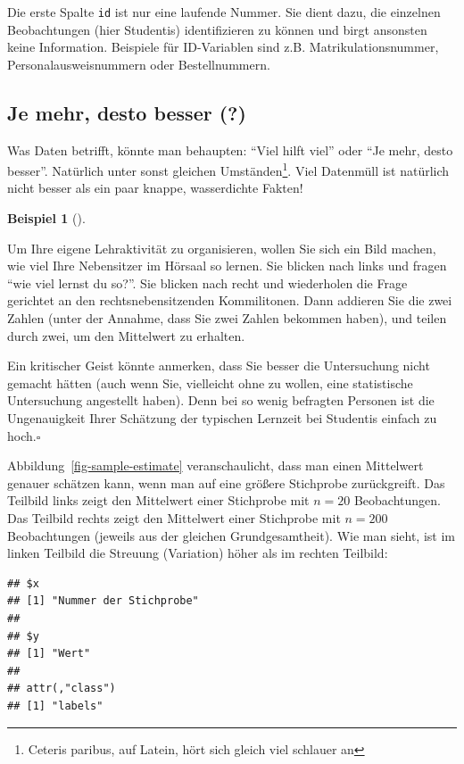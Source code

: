 \documentclass[
  a4paper,
  DIV=11]{scrreprt}
\theoremstyle{definition}
\theoremstyle{definition}
\newtheorem{example}{Beispiel}[chapter]
\theoremstyle{definition}
\theoremstyle{remark}
\begin{document}
Die erste Spalte \texttt{id} ist nur eine laufende Nummer. Sie dient
dazu, die einzelnen Beobachtungen (hier Studentis) identifizieren zu
können und birgt ansonsten keine Information. Beispiele für ID-Variablen
sind z.B. Matrikulationsnummer, Personalausweisnummern oder
Bestellnummern.

\subsection{Je mehr, desto besser (?)}\label{je-mehr-desto-besser}

Was Daten betrifft, könnte man behaupten: ``Viel hilft viel'' oder ``Je
mehr, desto besser''. Natürlich unter sonst gleichen
Umständen\footnote{Ceteris paribus, auf Latein, hört sich gleich viel
  schlauer an}. Viel Datenmüll ist natürlich nicht besser als ein paar
knappe, wasserdichte Fakten!

\begin{example}[]\protect\hypertarget{exm-samplesize}{}\label{exm-samplesize}

Um Ihre eigene Lehraktivität zu organisieren, wollen Sie sich ein Bild
machen, wie viel Ihre Nebensitzer im Hörsaal so lernen. Sie blicken nach
links und fragen ``wie viel lernst du so?''. Sie blicken nach recht und
wiederholen die Frage gerichtet an den rechtsnebensitzenden
Kommilitonen. Dann addieren Sie die zwei Zahlen (unter der Annahme, dass
Sie zwei Zahlen bekommen haben), und teilen durch zwei, um den
Mittelwert zu erhalten.

Ein kritischer Geist könnte anmerken, dass Sie besser die Untersuchung
nicht gemacht hätten (auch wenn Sie, vielleicht ohne zu wollen, eine
statistische Untersuchung angestellt haben). Denn bei so wenig befragten
Personen ist die Ungenauigkeit Ihrer Schätzung der typischen Lernzeit
bei Studentis einfach zu hoch.\(\square\)

\end{example}

Abbildung~\ref{fig-sample-estimate} veranschaulicht, dass man einen
Mittelwert genauer schätzen kann, wenn man auf eine größere Stichprobe
zurückgreift. Das Teilbild links zeigt den Mittelwert einer Stichprobe
mit \(n=20\) Beobachtungen. Das Teilbild rechts zeigt den Mittelwert
einer Stichprobe mit \(n=200\) Beobachtungen (jeweils aus der gleichen
Grundgesamtheit). Wie man sieht, ist im linken Teilbild die Streuung
(Variation) höher als im rechten Teilbild:

\begin{verbatim}
## $x
## [1] "Nummer der Stichprobe"
## 
## $y
## [1] "Wert"
## 
## attr(,"class")
## [1] "labels"
\end{verbatim}
\end{document}
